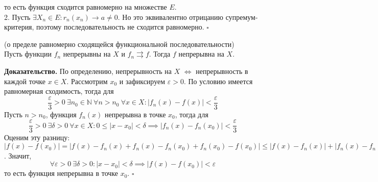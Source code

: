 то есть функция сходится равномерно на множестве $E$.\\
2. Пусть $\exists X_n\in E:r_n(x_n)\to a\ne 0$. Но это эквивалентно 
отрицанию супремум-критерия, поэтому последовательность не сходится 
равномерно. $\square$ 
\begin{theor}
    (о пределе равномерно сходящейся функциональной последовательности)\\
    Пусть функции $f_n$ непрерывны на  $X$ и  $f_n\rightrightarrows f$.
    Тогда $f$ непрерывна на  $X$. 
\end{theor}
\textbf{Доказательство.} По определению, непрерывность на $X$  
$\Leftrightarrow$ непрерывность в каждой точке $x\in X$. Рассмотрим
 $x_0$ и зафиксируем  $\varepsilon>0$. По условию имеется равномерная 
 сходимость, тогда для 
$$\frac{\varepsilon}{3}>0~\exists n_0\in \mathbb{N}~\forall n>n_0~
\forall x\in X:|f_n(x)-f(x)|<\frac{\varepsilon}{3}$$ 
Пусть $n>n_0$, функция  $f_n(x)$ непрерывна в точке  $x_0$, тогда для
$$\frac{\varepsilon}{3}>0~\exists \delta>0~\forall x\in X:0\leqslant 
|x-x_0|<\delta\implies|f_n(x)-f_n(x_0)|<\frac{\varepsilon}{3}$$
Оценим эту разницу: $|f(x)-f(x_0)|=|f(x)-f_n(x)+f_n(x)-f_n(x_0)+f_n(x_0)-
f(x_0)|\leqslant|f(x)-f_n(x)|+|f_n(x)-f_n(x_0)|+|f_n(x_0)-f(x_0)|<
\frac{\varepsilon}{3}+\frac{\varepsilon}{3}+\frac{\varepsilon}{3}$.
Значит, $$\forall \varepsilon>0~\exists \delta>0:|x-x_0|<\delta\implies
|f(x)-f(x_0)|<\varepsilon$$
то есть функция непрерывна в точке $x_0$. $\square$

